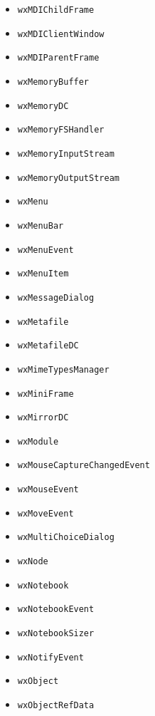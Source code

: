 \documentclass[a4paper,11pt,oneside,titlepage]{report}
\begin{document}
\begin{itemize}
\item \texttt{wxMDIChildFrame}
\item \texttt{wxMDIClientWindow}
\item \texttt{wxMDIParentFrame}
\item \texttt{wxMemoryBuffer}
\item \texttt{wxMemoryDC}
\item \texttt{wxMemoryFSHandler}
\item \texttt{wxMemoryInputStream}
\item \texttt{wxMemoryOutputStream}
\item \texttt{wxMenu}
\item \texttt{wxMenuBar}
\item \texttt{wxMenuEvent}
\item \texttt{wxMenuItem}
\item \texttt{wxMessageDialog}
\item \texttt{wxMetafile}
\item \texttt{wxMetafileDC}
\item \texttt{wxMimeTypesManager}
\item \texttt{wxMiniFrame}
\item \texttt{wxMirrorDC}
\item \texttt{wxModule}
\item \texttt{wxMouseCaptureChangedEvent}
\item \texttt{wxMouseEvent}
\item \texttt{wxMoveEvent}
\item \texttt{wxMultiChoiceDialog}
\item \texttt{wxNode}
\item \texttt{wxNotebook}
\item \texttt{wxNotebookEvent}
\item \texttt{wxNotebookSizer}
\item \texttt{wxNotifyEvent}
\item \texttt{wxObject}
\item \texttt{wxObjectRefData}


\end{itemize}
\end{document}
